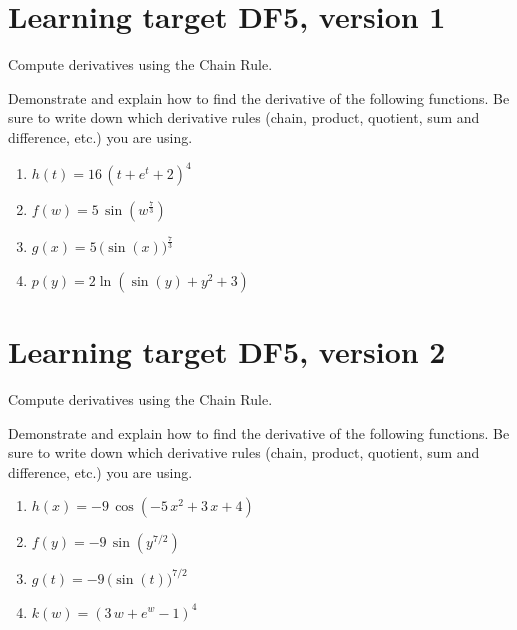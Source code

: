 
\usepackage{pgfplots}

\everymath{\displaystyle}


\section{Learning target DF5, version 1}

Compute derivatives using the Chain Rule.

\hrulefill

Demonstrate and explain how to find the derivative of the following functions. Be sure to write down which derivative rules (chain, product, quotient, sum and difference, etc.) you are using.

\begin{enumerate}
    \item \(h(t)= 16 \, {\left(t + e^{t} + 2\right)}^{4}\)
    \vfill
    \item \(f(w)= 5 \, \sin\left(w^{\frac{7}{3}}\right)\)
    \vfill
    \item \(g(x)= 5 \, \Big(\sin\left(x\right)\Big)^{\frac{7}{3}}\)
    \vfill
    \item \(p(y) = 2\ln\left(\sin(y) + y^2 + 3\right)\)
    \vfill
\end{enumerate}



\pagebreak

\section{Learning target DF5, version 2}

Compute derivatives using the Chain Rule.

\hrulefill

Demonstrate and explain how to find the derivative of the following functions. Be sure to write down which derivative rules (chain, product, quotient, sum and difference, etc.) you are using.

\begin{enumerate}
    \item \(h(x)= -9 \, \cos\left(-5 \, x^{2} + 3 \, x + 4\right)\)
    \vfill
    \item \(f(y)= -9 \, \sin\left(y^{7/2}\right)\)
    \vfill
    \item \(g(t)= -9 \, \Big(\sin\left(t\right)\Big)^{7/2}\)
    \vfill
    \item \(k(w)= {\left(3 \, w + e^{w} - 1\right)}^{4}\)
    \vfill
\end{enumerate}

